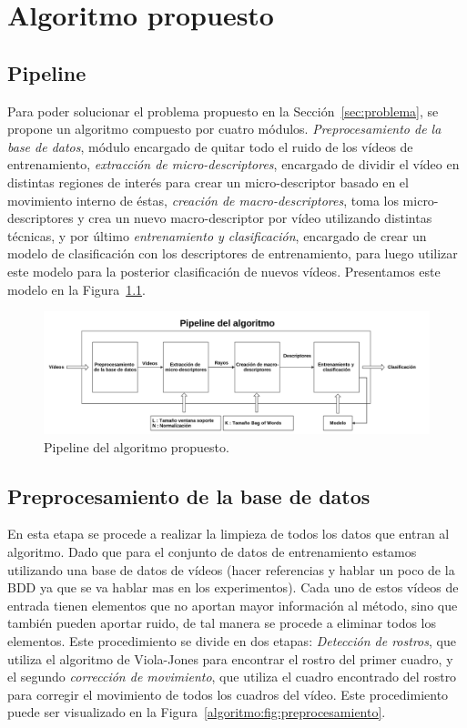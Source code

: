 \chapter[Algoritmo propuesto]{Algoritmo propuesto}
\label{ch:algoritmo}
\section{Pipeline}
\label{sec:pipeline}
Para poder solucionar el problema propuesto en la Sección~\ref{sec:problema}, se propone un algoritmo compuesto por cuatro módulos. \emph{Preprocesamiento de la base de datos}, módulo encargado de quitar todo el ruido de los vídeos de entrenamiento, \emph{extracción de micro-descriptores}, encargado de dividir el vídeo en distintas regiones de interés para crear un micro-descriptor basado en el movimiento interno de éstas, \emph{creación de macro-descriptores}, toma los micro-descriptores y crea un nuevo macro-descriptor por vídeo utilizando distintas técnicas, y por último \emph{entrenamiento y clasificación}, encargado de crear un modelo de clasificación con los descriptores de entrenamiento, para luego utilizar este modelo para la posterior clasificación de nuevos vídeos. Presentamos este modelo en la Figura~\ref{algoritmo:fig:pipeline}.

	\begin{figure}[bt]
		\centering
    		\includegraphics[width=1\textwidth]{Figuras/Diagramas/pipeline.png}
  		\caption{Pipeline del algoritmo propuesto.}
  		\label{algoritmo:fig:pipeline}
	\end{figure}	


\section{Preprocesamiento de la base de datos}
\label{sec:proc_bdd}
	En esta etapa se procede a realizar la limpieza de todos los datos que entran al algoritmo. Dado que para el conjunto de datos de entrenamiento estamos utilizando una base de datos de vídeos (hacer referencias y hablar un poco de la BDD ya que se va hablar mas en los experimentos). Cada uno de estos vídeos de entrada tienen elementos que no aportan mayor información al método, sino que también pueden aportar ruido, de tal manera se procede a eliminar todos los elementos. Este procedimiento se divide en dos etapas: \emph{Detección de rostros}, que utiliza el algoritmo de Viola-Jones para encontrar el rostro del primer cuadro, y el segundo \emph{corrección de movimiento}, que utiliza el cuadro encontrado del rostro para corregir el movimiento de todos los cuadros del vídeo. Este procedimiento puede ser visualizado en la Figura~\ref{algoritmo:fig:preprocesamiento}. 
	
